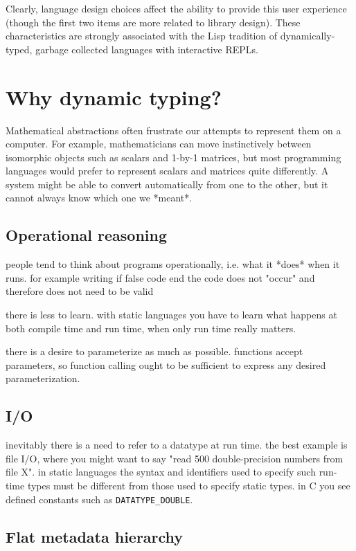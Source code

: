 {Clearly, language design choices affect the ability to provide this
user experience (though the first two items are more related to
library design). These characteristics are strongly associated
with the Lisp tradition of dynamically-typed, garbage collected
languages with interactive REPLs.


\section{Why dynamic typing?}

Mathematical abstractions often frustrate our attempts to represent them
on a computer. For example, mathematicians can move instinctively between
isomorphic objects such as scalars and 1-by-1 matrices, but most programming
languages would prefer to represent scalars and matrices quite differently.
A system might be able to convert automatically from one to the other, but
it cannot always know which one we *meant*.


\subsection{Operational reasoning}

people tend to think about programs operationally, i.e. what it *does* when
it runs. for example writing
if false
  code
end
the code does not "occur" and therefore does not need to be valid


there is less to learn. with static languages you have to learn what happens
at both compile time and run time, when only run time really matters.


there is a desire to parameterize as much as possible. functions
accept parameters, so function calling ought to be sufficient to express
any desired parameterization.


\subsection{I/O}

inevitably there is a need to refer to a datatype at run time. the best
example is file I/O, where you might want to say "read 500 double-precision
numbers from file X". in static languages the syntax and identifiers used
to specify such run-time types must be different from those used to specify
static types. in C you see defined constants such as \texttt{DATATYPE\_DOUBLE}.


\subsection{Flat metadata hierarchy}

}
